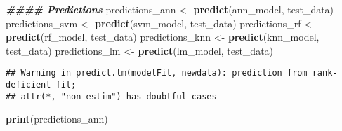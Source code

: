 \documentclass[
]{article}
\newenvironment{Shaded}{\begin{snugshade}}{\end{snugshade}}
\newcommand{\DocumentationTok}[1]{\textcolor[rgb]{0.56,0.35,0.01}{\textbf{\textit{#1}}}}
\newcommand{\FunctionTok}[1]{\textcolor[rgb]{0.13,0.29,0.53}{\textbf{#1}}}
\newcommand{\NormalTok}[1]{#1}
\newcommand{\OtherTok}[1]{\textcolor[rgb]{0.56,0.35,0.01}{#1}}
\begin{document}
\begin{Shaded}
\begin{Highlighting}[]
\DocumentationTok{\#\#\#\# Predictions}
\NormalTok{predictions\_ann }\OtherTok{\textless{}{-}} \FunctionTok{predict}\NormalTok{(ann\_model, test\_data)}
\NormalTok{predictions\_svm }\OtherTok{\textless{}{-}} \FunctionTok{predict}\NormalTok{(svm\_model, test\_data)}
\NormalTok{predictions\_rf }\OtherTok{\textless{}{-}} \FunctionTok{predict}\NormalTok{(rf\_model, test\_data)}
\NormalTok{predictions\_knn }\OtherTok{\textless{}{-}} \FunctionTok{predict}\NormalTok{(knn\_model, test\_data)}
\NormalTok{predictions\_lm }\OtherTok{\textless{}{-}} \FunctionTok{predict}\NormalTok{(lm\_model, test\_data)}
\end{Highlighting}
\end{Shaded}

\begin{verbatim}
## Warning in predict.lm(modelFit, newdata): prediction from rank-deficient fit;
## attr(*, "non-estim") has doubtful cases
\end{verbatim}

\begin{Shaded}
\begin{Highlighting}[]
\FunctionTok{print}\NormalTok{(predictions\_ann)}
\end{Highlighting}
\end{Shaded}
\end{document}
